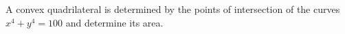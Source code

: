 A convex quadrilateral is determined by the points of intersection of the curves $x^4+y^4=100$ and  determine its area.
